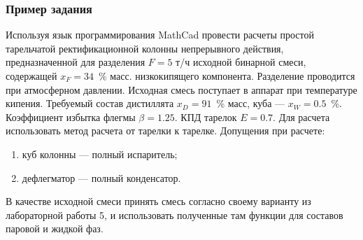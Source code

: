 \subsubsection{Пример задания}
Используя язык программирования MathCad провести расчеты простой тарельчатой ректификационной колонны непрерывного действия, предназначенной для разделения $F = 5$ т/ч исходной бинарной смеси, содержащей  $x_F = 34$~\% масс. низкокипящего компонента. Разделение проводится при атмосферном давлении. Исходная смесь поступает в аппарат при температуре кипения. Требуемый состав дистиллята $x_D = 91$~\% масс, куба --- $x_W = 0.5$~\%. Коэффициент избытка флегмы $\beta = 1.25$. КПД тарелок $E = 0.7$.
Для расчета использовать метод расчета от тарелки к тарелке. Допущения при расчете:
\begin{enumerate}
	\item куб колонны --- полный испаритель;
	\item дефлегматор --- полный конденсатор.
\end{enumerate}

В качестве исходной смеси принять смесь согласно своему варианту из лабораторной работы 5, и использовать полученные там функции для составов паровой и жидкой фаз.


